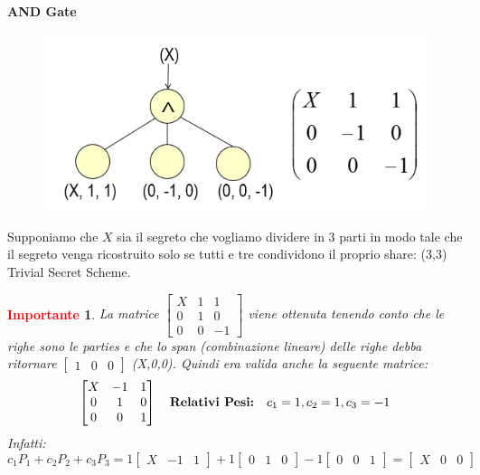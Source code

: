 \documentclass{book}
\newtheorem*{Importante}{\textbf{\textcolor{red}{Importante}}}
\begin{document}
\paragraph{AND Gate}
\setlength\intextsep{0pt}
\begin{figure}
	\centering
    \includegraphics[scale=0.4]{2022-01-08-17-49-09.png}%
\end{figure}
Supponiamo che \(X\) sia il segreto che vogliamo dividere in 3 parti in modo tale che il segreto venga ricostruito solo se tutti e tre condividono il proprio share: (3,3) Trivial Secret Scheme.
\bigskip \bigskip
\begin{Importante}
    La matrice \(\begin{bmatrix}
        X&1&1\\0&1&0\\0&0&-1
    \end{bmatrix}\) viene ottenuta tenendo conto che le righe sono le parties e che lo span (combinazione lineare) delle righe debba ritornare \(\begin{bmatrix}
        1&0&0
    \end{bmatrix}\) (X,0,0)\@. Quindi era valida anche la seguente matrice:\begin{equation*}
        \begin{bmatrix}
            X&-1&1\\0&1&0\\0&0&1
        \end{bmatrix}\quad \text{\textbf{Relativi Pesi:}}\quad c_{1}=1,c_{2}=1,c_{3}=-1
    \end{equation*}
    Infatti:\begin{equation*}
        c_{1}P_{1}+c_{2}P_{2}+c_{3}P_{3}=1\begin{bmatrix}
            X&-1&1
        \end{bmatrix}+1\begin{bmatrix}
            0&1&0
        \end{bmatrix}-1\begin{bmatrix}
            0&0&1
        \end{bmatrix}=\begin{bmatrix}
            X&0&0
        \end{bmatrix}
    \end{equation*}
\end{Importante}
\medskip
\end{document}
